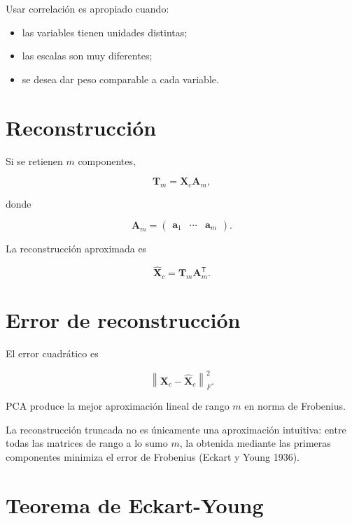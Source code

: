 \documentclass[
  spanish,
  10.5pt,
  letterpaper,
  DIV=11,
  numbers=noendperiod,
  oneside,
  open=any]{scrreprt}
\providecommand{\tightlist}{%
  \setlength{\itemsep}{0pt}\setlength{\parskip}{0pt}}
\theoremstyle{definition}
\theoremstyle{definition}
\theoremstyle{plain}
\theoremstyle{remark}
\begin{document}
Usar correlación es apropiado cuando:

\begin{itemize}
\tightlist
\item
  las variables tienen unidades distintas;
\item
  las escalas son muy diferentes;
\item
  se desea dar peso comparable a cada variable.
\end{itemize}

\section*{Reconstrucción}\label{reconstrucciuxf3n}


Si se retienen \(m\) componentes,

\[
\mathbf{T}_m
=
\mathbf{X}_c\mathbf{A}_m,
\]

donde

\[
\mathbf{A}_m
=
\begin{pmatrix}
\mathbf{a}_1 & \cdots & \mathbf{a}_m
\end{pmatrix}.
\]

La reconstrucción aproximada es

\[
\widehat{\mathbf{X}}_c
=
\mathbf{T}_m
\mathbf{A}_m^{\mathsf T}.
\]

\section*{Error de reconstrucción}\label{error-de-reconstrucciuxf3n}


El error cuadrático es

\[
\left\|
\mathbf{X}_c
-
\widehat{\mathbf{X}}_c
\right\|_F^2.
\]

PCA produce la mejor aproximación lineal de rango \(m\) en norma de
Frobenius.

La reconstrucción truncada no es únicamente una aproximación intuitiva:
entre todas las matrices de rango a lo sumo \(m\), la obtenida mediante
las primeras componentes minimiza el error de Frobenius (Eckart y Young
1936).

\section*{Teorema de Eckart-Young}\label{teorema-de-eckart-young}
\end{document}

